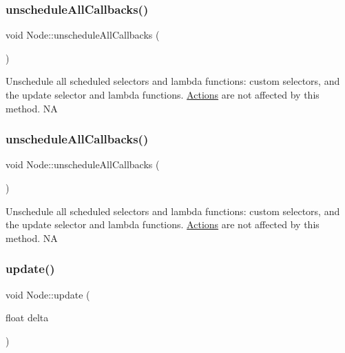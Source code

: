 \subsubsection{\texorpdfstring{unschedule\+All\+Callbacks()}{unscheduleAllCallbacks()}\hspace{0.1cm}{\footnotesize\ttfamily [1/2]}}
{\footnotesize\ttfamily void Node\+::unschedule\+All\+Callbacks (\begin{DoxyParamCaption}{ }\end{DoxyParamCaption})}

Unschedule all scheduled selectors and lambda functions\+: custom selectors, and the \textquotesingle{}update\textquotesingle{} selector and lambda functions. \hyperlink{classActions}{Actions} are not affected by this method.  NA \mbox{\label{classNode_ab8711d9b97d8b944a95c4227c7e9869f}} 
\subsubsection{\texorpdfstring{unschedule\+All\+Callbacks()}{unscheduleAllCallbacks()}\hspace{0.1cm}{\footnotesize\ttfamily [2/2]}}
{\footnotesize\ttfamily void Node\+::unschedule\+All\+Callbacks (\begin{DoxyParamCaption}{ }\end{DoxyParamCaption})}

Unschedule all scheduled selectors and lambda functions\+: custom selectors, and the \textquotesingle{}update\textquotesingle{} selector and lambda functions. \hyperlink{classActions}{Actions} are not affected by this method.  NA \mbox{\label{classNode_a32878481ba54b3856ab53c10af13848e}} 
\subsubsection{\texorpdfstring{update()}{update()}\hspace{0.1cm}{\footnotesize\ttfamily [1/2]}}
{\footnotesize\ttfamily void Node\+::update (\begin{DoxyParamCaption}\item[{float}]{delta }\end{DoxyParamCaption})\hspace{0.3cm}{\ttfamily [virtual]}}

